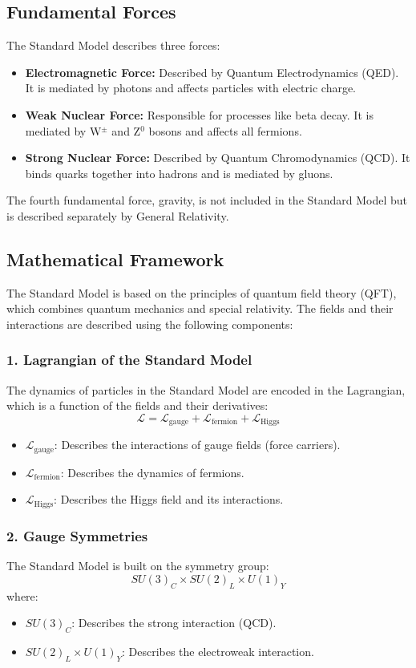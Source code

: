 \subsection{Fundamental Forces}
The Standard Model describes three forces:
\begin{itemize}
    \item \textbf{Electromagnetic Force:} Described by Quantum Electrodynamics (QED). It is mediated by photons and affects particles with electric charge.
    \item \textbf{Weak Nuclear Force:} Responsible for processes like beta decay. It is mediated by W$^\pm$ and Z$^0$ bosons and affects all fermions.
    \item \textbf{Strong Nuclear Force:} Described by Quantum Chromodynamics (QCD). It binds quarks together into hadrons and is mediated by gluons.
\end{itemize}

The fourth fundamental force, gravity, is not included in the Standard Model but is described separately by General Relativity.


\subsection{Mathematical Framework}
The Standard Model is based on the principles of quantum field theory (QFT), which combines quantum mechanics and special relativity. The fields and their interactions are described using the following components:

\subsubsection{1. Lagrangian of the Standard Model}
The dynamics of particles in the Standard Model are encoded in the Lagrangian, which is a function of the fields and their derivatives:
\[
\mathcal{L} = \mathcal{L}_{\text{gauge}} + \mathcal{L}_{\text{fermion}} + \mathcal{L}_{\text{Higgs}}
\]
\begin{itemize}
    \item $\mathcal{L}_{\text{gauge}}$: Describes the interactions of gauge fields (force carriers).
    \item $\mathcal{L}_{\text{fermion}}$: Describes the dynamics of fermions.
    \item $\mathcal{L}_{\text{Higgs}}$: Describes the Higgs field and its interactions.
\end{itemize}

\subsubsection{2. Gauge Symmetries}
The Standard Model is built on the symmetry group:
\[
SU(3)_C \times SU(2)_L \times U(1)_Y
\]
where:
\begin{itemize}
    \item $SU(3)_C$: Describes the strong interaction (QCD).
    \item $SU(2)_L \times U(1)_Y$: Describes the electroweak interaction.
\end{itemize}

